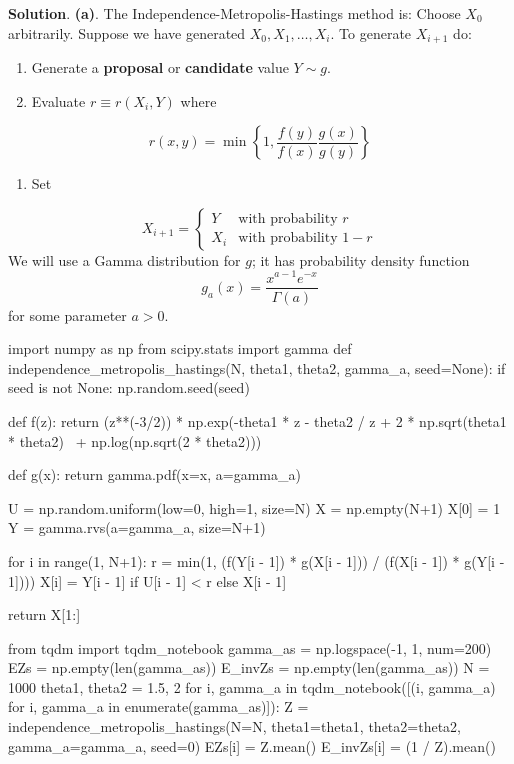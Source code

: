 \textbf{Solution}.
\textbf{(a)}. The Independence-Metropolis-Hastings method is:
Choose \(X_{0}\) arbitrarily. Suppose we have generated
\(X_{0}, X_{1}, \dots, X_{i}\). To generate \(X_{i+1}\) do:
\begin{enumerate}[tightlist,label={\arabic*.}]
\item
  Generate a \textbf{proposal} or \textbf{candidate} value \(Y \sim g\).
\item
  Evaluate \(r \equiv r(X_{i}, Y)\) where
\end{enumerate}
\[
r(x, y) = \min \left\{ 1, \frac{f(y)}{f(x)} \frac{g(x)}{g(y)} \right\}
\]
\begin{enumerate}[tightlist,label={\arabic*.},resume]
\item
  Set
\end{enumerate}
\[
X_{i+1} = \begin{cases}
Y   &\text{with probability } r \\
X_{i} &\text{with probability } 1 - r 
\end{cases}
\]
We will use a Gamma distribution for \(g\); it has probability density
function
\[
g_a(x) = \frac{x^{a - 1} e^{-x}}{\Gamma(a)}
\]
for some parameter \(a > 0\).

\begin{python}
import numpy as np
from scipy.stats import gamma
def independence_metropolis_hastings(N, theta1, theta2, gamma_a, seed=None):
    if seed is not None:
        np.random.seed(seed)
            
    def f(z):
        return (z**(-3/2)) * np.exp(-theta1 * z - theta2 / z + 2 * np.sqrt(theta1 * theta2) \ 
            + np.log(np.sqrt(2 * theta2)))
        
    def g(x):
        return gamma.pdf(x=x, a=gamma_a)
    
    U = np.random.uniform(low=0, high=1, size=N)
    X = np.empty(N+1)
    X[0] = 1
    Y = gamma.rvs(a=gamma_a, size=N+1)
    
    for i in range(1, N+1):
        r = min(1, (f(Y[i - 1]) * g(X[i - 1])) / (f(X[i - 1]) * g(Y[i - 1])))
        X[i] = Y[i - 1] if U[i - 1] < r else X[i - 1]
        
    return X[1:]
\end{python}

\begin{python}
from tqdm import tqdm_notebook
gamma_as = np.logspace(-1, 1, num=200)
EZs = np.empty(len(gamma_as))
E_invZs = np.empty(len(gamma_as))
N = 1000
theta1, theta2 = 1.5, 2
for i, gamma_a in tqdm_notebook([(i, gamma_a) for i, gamma_a in enumerate(gamma_as)]):
    Z = independence_metropolis_hastings(N=N, theta1=theta1, theta2=theta2, 
                                         gamma_a=gamma_a, seed=0)
    EZs[i] = Z.mean()
    E_invZs[i] = (1 / Z).mean()
\end{python}

